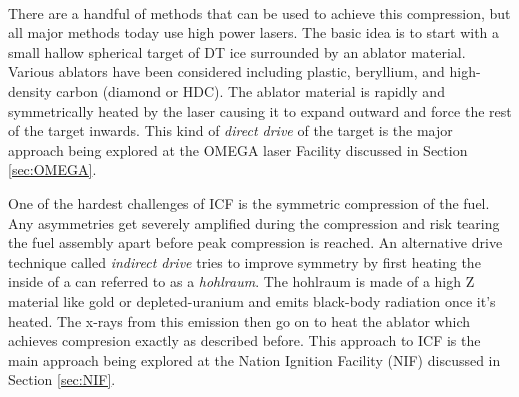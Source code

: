 	 \\
	
	There are a handful of methods that can be used to achieve this compression, but all major methods today use high power lasers. The basic idea is to start with a small hallow spherical target of DT ice surrounded by an ablator material. Various ablators have been considered including plastic, beryllium, and high-density carbon (diamond or HDC). The ablator material is rapidly and symmetrically heated by the laser causing it to expand outward and force the rest of the target inwards. This kind of \emph{direct drive} of the target is the major approach being explored at the OMEGA laser Facility discussed in Section \ref{sec:OMEGA}. 
	
	\begin{figure}[h!]
		\centering
		\caption{}
	\end{figure}
	
	One of the hardest challenges of ICF is the symmetric compression of the fuel. Any asymmetries get severely amplified during the compression and risk tearing the fuel assembly apart before peak compression is reached. An alternative drive technique called \emph{indirect drive} tries to improve symmetry by first heating the inside of a can referred to as a \emph{hohlraum}. The hohlraum is made of a high Z material like gold or depleted-uranium and emits black-body radiation once it's heated. The x-rays from this emission then go on to heat the ablator which achieves compresion exactly as described before. This approach to ICF is the main approach being explored at the Nation Ignition Facility (NIF) discussed in Section \ref{sec:NIF}. 
	
	\begin{figure}[h!]
		\centering
		\caption{}
	\end{figure}

	

